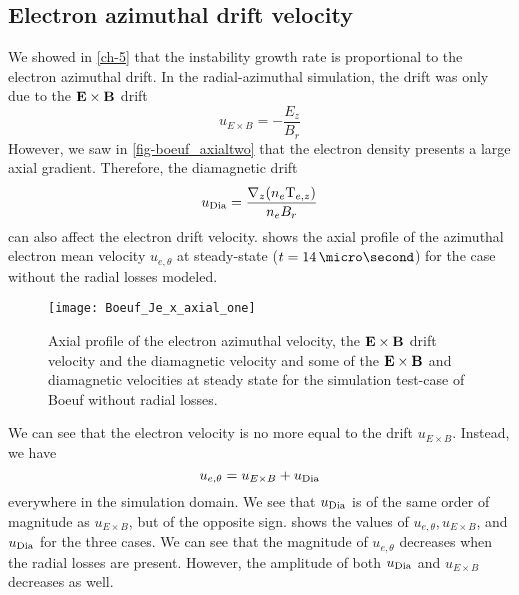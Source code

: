 
  \subsection{Electron azimuthal drift velocity} \label{subsec-drift}

  We showed in \cref{ch-5} that the instability growth rate is proportional to the electron azimuthal drift.
  In the radial-azimuthal simulation, the drift was only due to the ${\mathbf E} \times {\mathbf B}$ drift
  \begin{equation} \label{eq-exbdrift}
    u_{E \times B} = - \frac{E_z}{B_r}
  \end{equation}
  However, we saw in \cref{fig-boeuf_axialtwo} that the electron density presents a large axial gradient.
  Therefore, the diamagnetic drift
  $$u_{\rm Dia}=\frac{\nabla_z (n_e {\rm T}_{e,z})}{n_e B_r}$$
  can also affect the electron drift velocity.
   shows the axial profile of the azimuthal electron mean velocity $u_{e, \theta}$ at steady-state ($t = 14\,\micro\second$) for the case without the radial losses modeled.

 
  \begin{figure}[hbt]
    \centering
    \texttt{[image: Boeuf\_Je\_x\_axial\_one]}
    \caption{Axial profile of the electron azimuthal velocity, the ${\mathbf E} \times {\mathbf B}$ drift velocity and the diamagnetic velocity and some of the ${\mathbf E} \times {\mathbf B}$ and diamagnetic velocities at steady state for the simulation test-case of Boeuf without radial losses.}
    \label{fig-Jetheta_sum}
  \end{figure}
  
  We can see that the electron velocity is no more equal to the drift $u_{E \times B}$.
  Instead, we have 
  $$ u_{e, \theta} =   u_{E \times B} + u_{\rm Dia}$$
  everywhere in the simulation domain.
  We see that $u_{\rm Dia}$ is of the same order of magnitude as $u_{E \times B}$, but of the opposite sign.
   shows the values of $ u_{e, \theta},   u_{E \times B}$, and $u_{\rm Dia}$ for the three cases.
  We can see that the magnitude of $u_{e, \theta} $ decreases when the radial losses are present.
  However, the amplitude of both $u_{\rm Dia}$ and $u_{E \times B}$ decreases as well.

